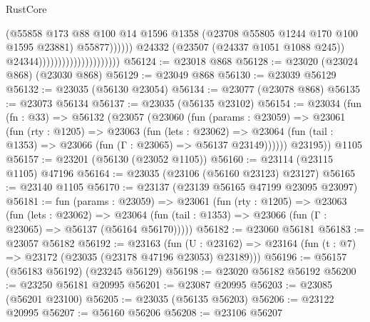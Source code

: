 \begin{lexlean}{RustCore}
\begin{coremodule}
                                                        (@55858
                                                          @173
                                                          @88
                                                          @100
                                                          @14
                                                          @1596
                                                          @1358
                                                          (@23708
                                                            @55805
                                                            @1244
                                                            @170
                                                            @100
                                                            @1595
                                                            @23881)
                                                          @55877))))))
                                              @24332
                                              (@23507 (@24337 @1051 @1088 @245))
                                              @24344)))))))))))))))))))))
@56124 := @23018 @868
@56128 := @23020 (@23024 @868) (@23030 @868)
@56129 := @23049 @868
@56130 := @23039 @56129
@56132 := @23035 (@56130 @23054)
@56134 := @23077 (@23078 @868)
@56135 := @23073 @56134
@56137 := @23035 (@56135 @23102)
@56154 := @23034
    (fun (fn : @33) =>
    @56132
      (@23057
        (@23060
          (fun (params : @23059) =>
          @23061
            (fun (rty : @1205) =>
            @23063
              (fun (lets : @23062) =>
              @23064 (fun (tail : @1353) => @23066 (fun (Γ : @23065) => @56137 @23149))))))
        @23195))
    @1105
@56157 := @23201 (@56130 (@23052 @1105))
@56160 := @23114 (@23115 @1105) @47196
@56164 := @23035 (@23106 (@56160 @23123) @23127)
@56165 := @23140 @1105
@56170 := @23137 (@23139 @56165 @47199 @23095 @23097)
@56181 := fun (params : @23059) =>
  @23061
    (fun (rty : @1205) =>
    @23063
      (fun (lets : @23062) =>
      @23064 (fun (tail : @1353) => @23066 (fun (Γ : @23065) => @56137 (@56164 @56170)))))
@56182 := @23060 @56181
@56183 := @23057 @56182
@56192 := @23163
    (fun (U : @23162) => @23164 (fun (t : @7) => @23172 (@23035 (@23178 @47196 @23053) @23189)))
@56196 := @56157 (@56183 @56192) (@23245 @56129)
@56198 := @23020 @56182 @56192
@56200 := @23250 @56181 @20995
@56201 := @23087 @20995
@56203 := @23085 (@56201 @23100)
@56205 := @23035 (@56135 @56203)
@56206 := @23122 @20995
@56207 := @56160 @56206
@56208 := @23106 @56207

\end{coremodule}
\end{lexlean}
